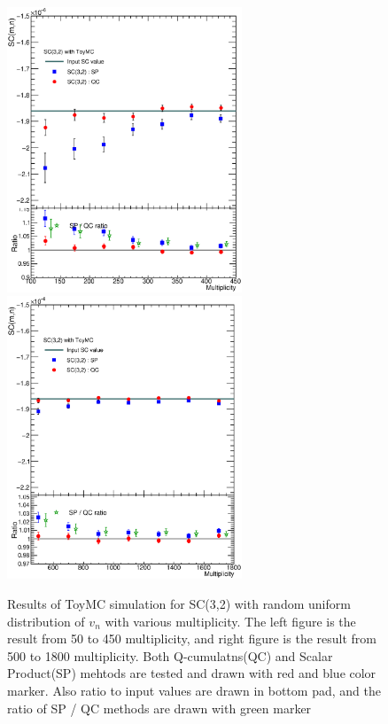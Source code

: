 \begin{figure}[h]
\centerline{\includegraphics[width=7.0cm]{figures/figs_ToyMC/SC_Comparison_SC32_ToyMC_low_woJet}
\includegraphics[width=7.0cm]{figures/figs_ToyMC/SC_Comparison_SC32_highonly_ToyMC_woJet}}
\caption{Results of ToyMC simulation for SC(3,2) with random uniform distribution of $v_n$ with various multiplicity. The left figure is the result from 50 to 450 multiplicity, and right figure is the result from 500 to 1800 multiplicity. Both Q-cumulatns(QC) and Scalar Product(SP) mehtods are tested and drawn with red and blue color marker. Also ratio to input values are drawn in bottom pad, and the ratio of SP / QC methods are drawn with green marker}
\label{fig:ToyMC_Uniform_SC32_woJet}
\end{figure}


